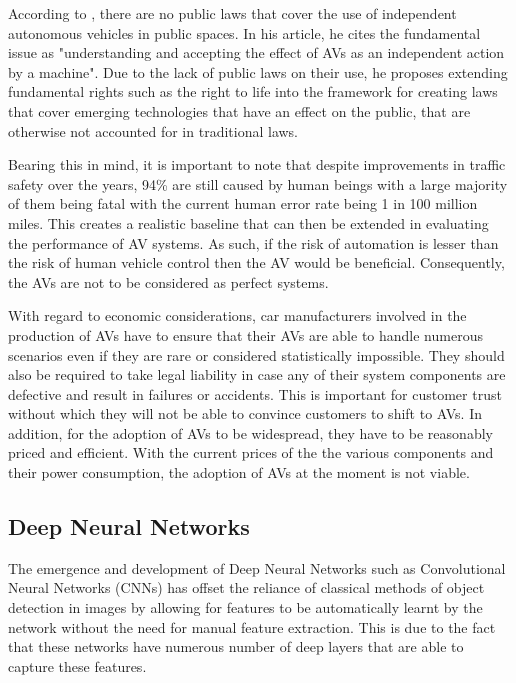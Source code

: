 According to \cite{gasser2016fundamental}, there are no public laws that cover the  use of independent autonomous vehicles in public spaces. In his article, he cites the fundamental issue as "understanding and accepting the effect of AVs as an independent action by a machine". Due to the lack of public laws on their use, he proposes extending fundamental rights such as the right to life into the framework for creating laws that cover emerging technologies that have an effect on the public, that are otherwise not accounted for in traditional laws. 

Bearing this in mind, it is important to note that despite improvements in traffic safety over the years, 94\% are still caused by human beings with a large majority of them being fatal with the current human error rate being 1 in 100 million miles. This creates a realistic baseline that can then be extended in evaluating the performance of AV systems. As such, if the risk of automation is lesser than the risk of human vehicle control then the AV would be beneficial. Consequently, the AVs are not to be considered as perfect systems.

With regard to economic considerations, car manufacturers involved in the production of AVs have to ensure that their AVs are able to handle numerous scenarios even if they are rare or considered statistically impossible. They should also be required to take legal liability in case any of their system components are defective and result in failures or accidents. This is important for customer trust without which they will not be able to convince customers to shift to AVs. In addition, for the adoption of AVs to be widespread, they have to be reasonably priced and efficient. With the current prices of the the various components and their power consumption, the adoption of AVs at the moment is not viable. 








\subsection{Deep Neural Networks}

The emergence and development of Deep Neural Networks such as Convolutional Neural Networks (CNNs)\cite{lawrence1997face} has offset the reliance of classical methods of object detection in images by allowing for features to be automatically learnt by the network without the need for manual feature extraction. This is due to the fact that these networks have numerous number of deep layers that are able to capture these features.  

